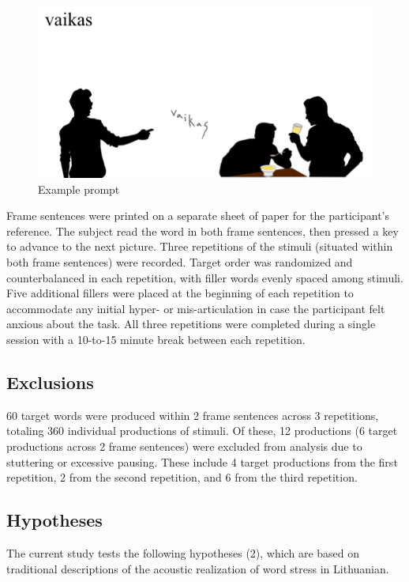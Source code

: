\documentclass[english,man]{apa6}
\theoremstyle{definition}
\theoremstyle{definition}
\theoremstyle{definition}
\theoremstyle{remark}
\begin{document}
\begin{figure}
\centering
\includegraphics{../figs/Picture1.png}
\caption{Example prompt}
\end{figure}

Frame sentences were printed on a separate sheet of paper for the
participant's reference. The subject read the word in both frame
sentences, then pressed a key to advance to the next picture. Three
repetitions of the stimuli (situated within both frame sentences) were
recorded. Target order was randomized and counterbalanced in each
repetition, with filler words evenly spaced among stimuli. Five
additional fillers were placed at the beginning of each repetition to
accommodate any initial hyper- or mis-articulation in case the
participant felt anxious about the task. All three repetitions were
completed during a single session with a 10-to-15 minute break between
each repetition.

\subsection{Exclusions}\label{exclusions}

60 target words were produced within 2 frame sentences across 3
repetitions, totaling 360 individual productions of stimuli. Of these,
12 productions (6 target productions across 2 frame sentences) were
excluded from analysis due to stuttering or excessive pausing. These
include 4 target productions from the first repetition, 2 from the
second repetition, and 6 from the third repetition.

\subsection{Hypotheses}\label{hypotheses}

The current study tests the following hypotheses (2), which are based on
traditional descriptions of the acoustic realization of word stress in
Lithuanian.
\end{document}
